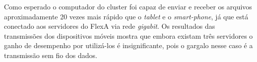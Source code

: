     Como esperado o computador do cluster foi capaz de enviar e receber os arquivos aproximadamente 20 vezes mais rápido que o \textit{tablet} e o \textit{smart-phone}, já que está conectado aos servidores do FlexA via rede \textit{gigabit}. Os resultados das transmissões dos dispositivos móveis mostra que embora existam três servidores o ganho de desempenho por utilizá-los é insignificante, pois o gargalo nesse caso é a transmissão sem fio dos dados.
    


    